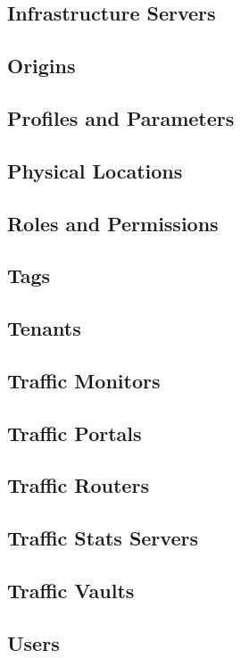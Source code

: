 \subsection{Infrastructure Servers}



\subsection{Origins}



\subsection{Profiles and Parameters}



\subsection{Physical Locations}



\subsection{Roles and Permissions\label{sec:roles-and-perms}}



\subsection{Tags}



\subsection{Tenants}



\subsection{Traffic Monitors}



\subsection{Traffic Portals}



\subsection{Traffic Routers}



\subsection{Traffic Stats Servers}



\subsection{Traffic Vaults}



\subsection{Users\label{sec:users}}
